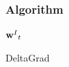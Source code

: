 \documentclass{beamer}
\begin{document}
\begin{frame}[fragile]
  \frametitle{Algorithm}
  
\begin{algorithm}[H] 
  \small
  
  
  
  
      
      
      
      
      
      
      
  
  \Return ${\textbf{w}^{I}}_{t}$
  \caption{DeltaGrad}
  \label{alg: update_algorithm}
  \end{algorithm}

\end{frame}
\end{document}
